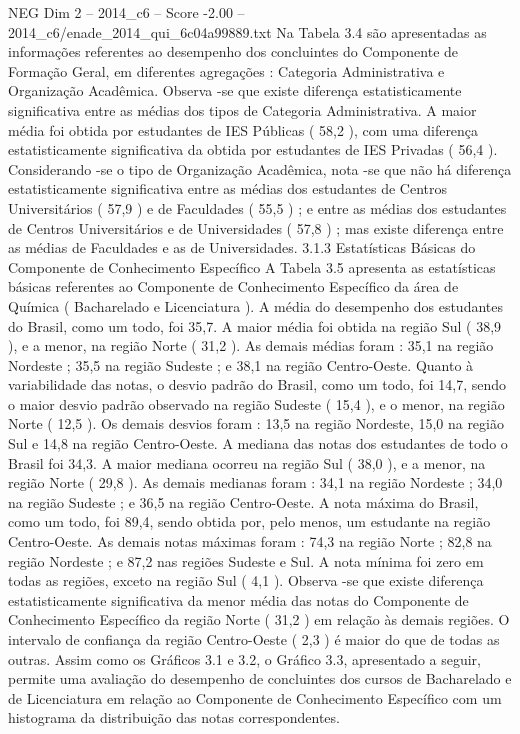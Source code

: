 \begin{textsample}{NEG Dim 2 – 2014\_c6 – Score -2.00 – 2014\_c6/enade\_2014\_qui\_6c04a99889.txt}
Na Tabela 3.4 são apresentadas as informações referentes ao desempenho dos concluintes do Componente de Formação Geral, em diferentes agregações : Categoria Administrativa e Organização Acadêmica.
Observa -se que existe diferença estatisticamente significativa entre as médias dos tipos de Categoria Administrativa.
A maior média foi obtida por estudantes de IES Públicas ( 58,2 ), com uma diferença estatisticamente significativa da obtida por estudantes de IES Privadas ( 56,4 ).
Considerando -se o tipo de Organização Acadêmica, nota -se que não há diferença estatisticamente significativa entre as médias dos estudantes de Centros Universitários ( 57,9 ) e de Faculdades ( 55,5 ) ; e entre as médias dos estudantes de Centros Universitários e de Universidades ( 57,8 ) ; mas existe diferença entre as médias de Faculdades e as de Universidades. 3.1.3 Estatísticas Básicas do Componente de Conhecimento Específico A Tabela 3.5 apresenta as estatísticas básicas referentes ao Componente de Conhecimento Específico da área de Química ( Bacharelado e Licenciatura ).
A média do desempenho dos estudantes do Brasil, como um todo, foi 35,7.
A maior média foi obtida na região Sul ( 38,9 ), e a menor, na região Norte ( 31,2 ).
As demais médias foram : 35,1 na região Nordeste ; 35,5 na região Sudeste ; e 38,1 na região Centro-Oeste.
Quanto à variabilidade das notas, o desvio padrão do Brasil, como um todo, foi 14,7, sendo o maior desvio padrão observado na região Sudeste ( 15,4 ), e o menor, na região Norte ( 12,5 ).
Os demais desvios foram : 13,5 na região Nordeste, 15,0 na região Sul e 14,8 na região Centro-Oeste.
A mediana das notas dos estudantes de todo o Brasil foi 34,3.
A maior mediana ocorreu na região Sul ( 38,0 ), e a menor, na região Norte ( 29,8 ).
As demais medianas foram : 34,1 na região Nordeste ; 34,0 na região Sudeste ; e 36,5 na região Centro-Oeste.
A nota máxima do Brasil, como um todo, foi 89,4, sendo obtida por, pelo menos, um estudante na região Centro-Oeste.
As demais notas máximas foram : 74,3 na região Norte ; 82,8 na região Nordeste ; e 87,2 nas regiões Sudeste e Sul.
A nota mínima foi zero em todas as regiões, exceto na região Sul ( 4,1 ).
Observa -se que existe diferença estatisticamente significativa da menor média das notas do Componente de Conhecimento Específico da região Norte ( 31,2 ) em relação às demais regiões.
O intervalo de confiança da região Centro-Oeste ( 2,3 ) é maior do que de todas as outras.
Assim como os Gráficos 3.1 e 3.2, o Gráfico 3.3, apresentado a seguir, permite uma avaliação do desempenho de concluintes dos cursos de Bacharelado e de Licenciatura em relação ao Componente de Conhecimento Específico com um histograma da distribuição das notas correspondentes.

\end{textsample}
